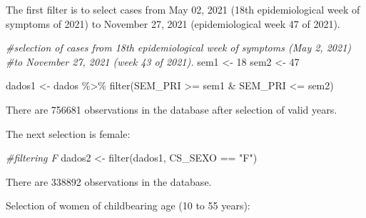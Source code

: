 \documentclass[
]{article}
\newenvironment{Shaded}{\begin{snugshade}}{\end{snugshade}}
\newcommand{\AttributeTok}[1]{\textcolor[rgb]{0.77,0.63,0.00}{#1}}
\newcommand{\CommentTok}[1]{\textcolor[rgb]{0.56,0.35,0.01}{\textit{#1}}}
\newcommand{\DecValTok}[1]{\textcolor[rgb]{0.00,0.00,0.81}{#1}}
\newcommand{\FunctionTok}[1]{\textcolor[rgb]{0.00,0.00,0.00}{#1}}
\newcommand{\NormalTok}[1]{#1}
\newcommand{\OtherTok}[1]{\textcolor[rgb]{0.56,0.35,0.01}{#1}}
\newcommand{\SpecialCharTok}[1]{\textcolor[rgb]{0.00,0.00,0.00}{#1}}
\newcommand{\StringTok}[1]{\textcolor[rgb]{0.31,0.60,0.02}{#1}}
\begin{document}
The first filter is to select cases from May 02, 2021 (18th
epidemiological week of symptoms of 2021) to November 27, 2021
(epidemiological week 47 of 2021).

\begin{Shaded}
\begin{Highlighting}[]
\CommentTok{\#selection of cases from 18th epidemiological week of symptoms (May 2, 2021) }
\CommentTok{\#to November 27, 2021 (week 43 of 2021).}
\NormalTok{sem1 }\OtherTok{\textless{}{-}} \DecValTok{18}
\NormalTok{sem2 }\OtherTok{\textless{}{-}} \DecValTok{47}

\NormalTok{dados1 }\OtherTok{\textless{}{-}}\NormalTok{ dados }\SpecialCharTok{\%\textgreater{}\%} 
  \FunctionTok{filter}\NormalTok{(SEM\_PRI }\SpecialCharTok{\textgreater{}=}\NormalTok{ sem1 }\SpecialCharTok{\&}\NormalTok{  SEM\_PRI }\SpecialCharTok{\textless{}=}\NormalTok{ sem2)}
\end{Highlighting}
\end{Shaded}

There are 756681 observations in the database after selection of valid
years.

The next selection is female:

\begin{Shaded}
\begin{Highlighting}[]
\CommentTok{\#filtering F}
\NormalTok{dados2 }\OtherTok{\textless{}{-}} \FunctionTok{filter}\NormalTok{(dados1, CS\_SEXO }\SpecialCharTok{==} \StringTok{"F"}\NormalTok{)}
\end{Highlighting}
\end{Shaded}

There are 338892 observations in the database.

Selection of women of childbearing age (10 to 55 years):

\begin{Shaded}
\end{Shaded}
\end{document}

